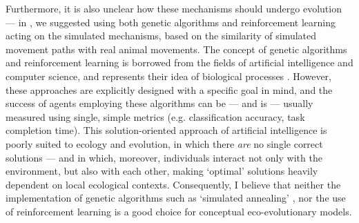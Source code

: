 Furthermore, it is also unclear how these mechanisms should undergo evolution --- in \textcite{nathan2022}, we suggested using both genetic algorithms and reinforcement learning acting on the simulated mechanisms, based on the similarity of simulated movement paths with real animal movements.
The concept of genetic algorithms and reinforcement learning is borrowed from the fields of artificial intelligence and computer science, and represents their idea of biological processes \parencite[evolution and learning, respectively][]{deangelis2019}.
However, these approaches are explicitly designed with a specific goal in mind, and the success of agents employing these algorithms can be --- and is --- usually measured using single, simple metrics (e.g. classification accuracy, task completion time).
This solution-oriented approach of artificial intelligence is poorly suited to ecology and evolution, in which there \textit{are} no single correct solutions --- and in which, moreover, individuals interact not only with the environment, but also with each other, making `optimal' solutions heavily dependent on local ecological contexts.
Consequently, I believe that neither the implementation of genetic algorithms such as `simulated annealing' \parencite{getz2015}, nor the use of reinforcement learning is a good choice for conceptual eco-evolutionary models.

